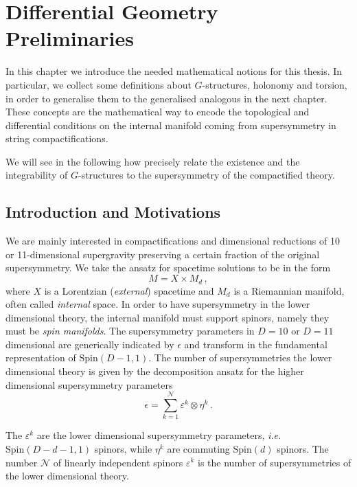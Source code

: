 \documentclass[debug]{phd}
\begin{document}
	\chapter{Differential Geometry Preliminaries}
	\label{chap1}
		In this chapter we introduce the needed mathematical notions for this thesis. 
		In particular, we collect some definitions about $G$-structures, holonomy and torsion, in order to generalise them to the generalised analogous in the next chapter.
		These concepts are the mathematical way to encode the topological and differential conditions on the internal manifold coming from supersymmetry in string compactifications. 
		
		We will see in the following how precisely relate the existence and the integrability of $G$-structures to the supersymmetry of the compactified theory.
		
		\section{Introduction and Motivations}
				We are mainly interested in compactifications and dimensional reductions of 10 or 11-dimensional supergravity preserving a certain fraction of the original supersymmetry. We take the ansatz for spacetime solutions to be in the form
						\begin{equation}\label{spacetimeans}
							M = X \times M_{d}\, ,
						\end{equation}
where $X$ is a Lorentzian (\emph{external}) spacetime and $M_{d}$ is a Riemannian manifold, often called \emph{internal} space.
In order to have supersymmetry in the lower dimensional theory, the internal manifold must support spinors, namely they must be \emph{spin manifolds}.
The supersymmetry parameters in $D=10$ or $D=11$ dimensional are generically indicated by $\epsilon$ and transform in the fundamental representation of $\mathrm{Spin}(D-1,1)$.
The number of supersymmetries the lower dimensional theory is given by the decomposition ansatz for the higher dimensional supersymmetry parameters
				\begin{equation*}
				 \epsilon = \sum_{k=1}^\mathcal{N} \varepsilon^k \otimes \eta^k\, .
				\end{equation*}

				The $\varepsilon^k$ are the lower dimensional supersymmetry parameters, \emph{i.e.} $\mathrm{Spin}(D-d-1,1)$ spinors, while $\eta^k$ are commuting $\mathrm{Spin}(d)$ spinors.
				The number $\mathcal{N}$ of linearly independent spinors $\varepsilon^k$ is the number of supersymmetries of the lower dimensional theory.
				
\end{document}
